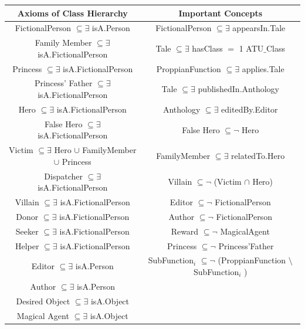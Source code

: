 \documentclass[10pt,a4paper]{article}
\begin{document}
\begin{table}[H]
\centering

\begin{tabular}{|c|c|}
Axioms of Class Hierarchy & Important Concepts \\
\hline

FictionalPerson $\subseteq \exists $ isA.Person & FictionalPerson $\subseteq \exists$ appearsIn.Tale \\
Family Member $\subseteq \exists $ isA.FictionalPerson & Tale $\subseteq \exists$ hasClass $=$ 1 ATU$\_$Class  \\
Princess $\subseteq \exists $ isA.FictionalPerson & ProppianFunction $\subseteq \exists$ applies.Tale \\
Princess' Father $\subseteq \exists $ isA.FictionalPerson & Tale  $\subseteq \exists$ publishedIn.Anthology   \\
Hero $\subseteq \exists $ isA.FictionalPerson & Anthology $\subseteq \exists$ editedBy.Editor    \\
False Hero $\subseteq \exists $ isA.FictionalPerson & False Hero $\subseteq \neg$ Hero  \\
Victim $\subseteq \exists $ Hero $\cup$ FamilyMember $\cup$ Princess & FamilyMember $\subseteq \exists$ relatedTo.Hero \\

Dispatcher $\subseteq \exists $ isA.FictionalPerson  & Villain $\subseteq \neg$ (Victim $\cap$ Hero) \\
Villain $\subseteq \exists $ isA.FictionalPerson &  Editor  $\subseteq \neg$ FictionalPerson  \\
Donor $\subseteq \exists $ isA.FictionalPerson & Author  $\subseteq \neg$ FictionalPerson   \\
Seeker $\subseteq \exists $ isA.FictionalPerson & Reward $\subseteq \neg$ MagicalAgent  \\
Helper $\subseteq \exists $ isA.FictionalPerson & Princess $\subseteq \neg$ Princess'Father \\
Editor $\subseteq \exists $ isA.Person & \tiny SubFunction$_{i}$ $\subseteq \neg$ (ProppianFunction $\setminus$ SubFunction$_{i}$ )   \\
Author $\subseteq \exists $ isA.Person   \\
Desired Object $\subseteq \exists $ isA.Object   \\
Magical Agent $\subseteq \exists $ isA.Object  \\



\end{tabular} 
\end{table}
\end{document}
